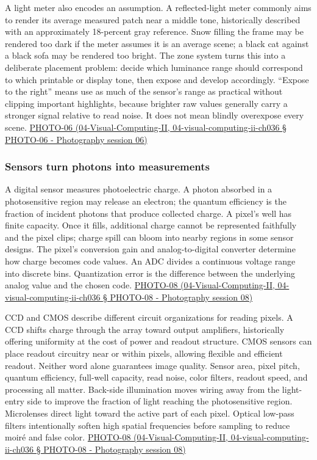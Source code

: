 A light meter also encodes an assumption. A reflected-light meter commonly aims to render its average measured patch near a middle tone, historically described with an approximately 18-percent gray reference. Snow filling the frame may be rendered too dark if the meter assumes it is an average scene; a black cat against a black sofa may be rendered too bright. The zone system turns this into a deliberate placement problem: decide which luminance range should correspond to which printable or display tone, then expose and develop accordingly. ``Expose to the right'' means use as much of the sensor's range as practical without clipping important highlights, because brighter raw values generally carry a stronger signal relative to read noise. It does not mean blindly overexpose every scene. \href{}{PHOTO-06 (04-Visual-Computing-II, 04-visual-computing-ii-ch036 § PHOTO-06 - Photography session 06)}

\subsubsection{Sensors turn photons into measurements}\label{sensors-turn-photons-into-measurements}

A digital sensor measures photoelectric charge. A photon absorbed in a photosensitive region may release an electron; the quantum efficiency is the fraction of incident photons that produce collected charge. A pixel's well has finite capacity. Once it fills, additional charge cannot be represented faithfully and the pixel clips; charge spill can bloom into nearby regions in some sensor designs. The pixel's conversion gain and analog-to-digital converter determine how charge becomes code values. An ADC divides a continuous voltage range into discrete bins. Quantization error is the difference between the underlying analog value and the chosen code. \href{}{PHOTO-08 (04-Visual-Computing-II, 04-visual-computing-ii-ch036 § PHOTO-08 - Photography session 08)}

CCD and CMOS describe different circuit organizations for reading pixels. A CCD shifts charge through the array toward output amplifiers, historically offering uniformity at the cost of power and readout structure. CMOS sensors can place readout circuitry near or within pixels, allowing flexible and efficient readout. Neither word alone guarantees image quality. Sensor area, pixel pitch, quantum efficiency, full-well capacity, read noise, color filters, readout speed, and processing all matter. Back-side illumination moves wiring away from the light-entry side to improve the fraction of light reaching the photosensitive region. Microlenses direct light toward the active part of each pixel. Optical low-pass filters intentionally soften high spatial frequencies before sampling to reduce moiré and false color. \href{}{PHOTO-08 (04-Visual-Computing-II, 04-visual-computing-ii-ch036 § PHOTO-08 - Photography session 08)}

